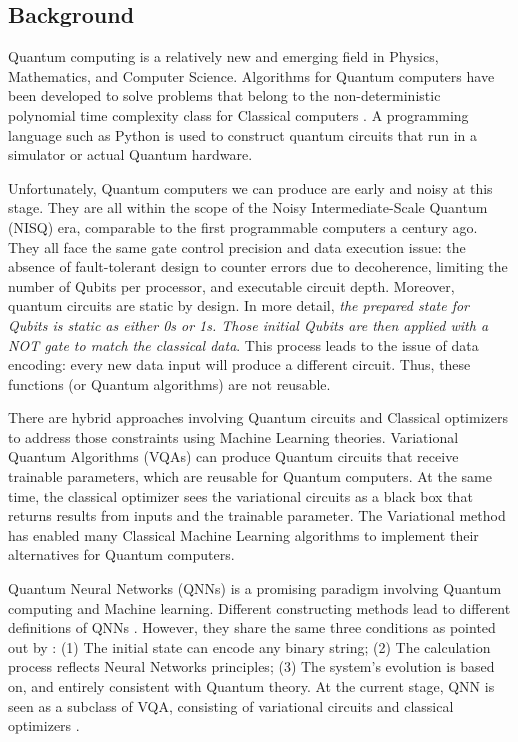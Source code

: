 \subsection{Background}\label{Background Section}
Quantum computing is a relatively new and emerging field in Physics, Mathematics, and Computer Science. 
Algorithms for Quantum computers have been developed to solve problems that belong to the non-deterministic polynomial time complexity class for Classical computers \cite{williamsSolvingNPCompleteProblems2011,jiangQuantumAnnealingPrime2018,farhiQuantumApproximateOptimization2014}. 
A programming language such as Python is used to construct quantum circuits that run in a simulator or actual Quantum hardware. 

Unfortunately, Quantum computers we can produce are early and noisy at this stage. 
They are all within the scope of the Noisy Intermediate-Scale Quantum (NISQ) era, comparable to the first programmable computers a century ago. 
They all face the same gate control precision and data execution issue: the absence of fault-tolerant design to counter errors due to decoherence, limiting the number of Qubits per processor, and executable circuit depth. 
Moreover, quantum circuits are static by design. In more detail, \emph{the prepared state for Qubits is static as either 0s or 1s. 
Those initial Qubits are then applied with a NOT gate to match the classical data}. This process leads to the issue of data encoding: every new data input will produce a different circuit. 
Thus, these functions (or Quantum algorithms) are not reusable.

There are hybrid approaches involving Quantum circuits and Classical optimizers to address those constraints using Machine Learning theories. 
Variational Quantum Algorithms (VQAs) \cite{cerezo2021variational} can produce Quantum circuits that receive trainable parameters, which are reusable for Quantum computers. 
At the same time, the classical optimizer sees the variational circuits as a black box that returns results from inputs and the trainable parameter. 
The Variational method has enabled many Classical Machine Learning algorithms to implement their alternatives for Quantum computers.

Quantum Neural Networks (QNNs) \cite{altaisky2001quantum} is a promising paradigm involving Quantum computing and Machine learning. 
Different constructing methods lead to different definitions of QNNs \cite{paetznick2013} \cite{zhaoBuildingQuantumNeural2019} \cite{caoQuantumNeuronElementary2017}. 
However, they share the same three conditions as pointed out by \citeauthor{schuldQuestQuantumNeural2014} \cite{schuldQuestQuantumNeural2014}: 
(1) The initial state can encode any binary string;
(2) The calculation process reflects Neural Networks principles;
(3) The system's evolution is based on, and entirely consistent with Quantum theory.
At the current stage, QNN is seen as a subclass of VQA, consisting of variational circuits and classical optimizers \cite{abbasPowerQuantumNeural2021}.

